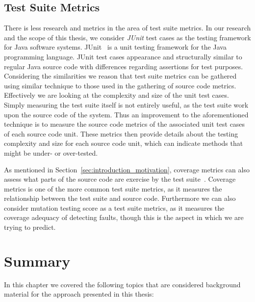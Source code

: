 \subsection{Test Suite Metrics}
\label{subsec:background_test_suite_metrics}
There is less research and metrics in the area of test suite metrics. In our research and the scope of this thesis, we consider \emph{JUnit} test cases as the testing framework for Java software systems. JUnit~\cite{JUnit} is a unit testing framework for the Java programming language. JUnit test cases appearance and structurally similar to regular Java source code with differences regarding assertions for test purposes. Considering the similarities we reason that test suite metrics can be gathered using similar technique to those used in the gathering of source code metrics. Effectively we are looking at the complexity and size of the unit test cases. Simply measuring the test suite itself is not entirely useful, as the test suite work upon the source code of the system. Thus an improvement to the aforementioned technique is to measure the source code metrics of the associated unit test cases of each source code unit. These metrics then provide details about the testing complexity and size for each source code unit, which can indicate methods that might be under- or over-tested.

As mentioned in Section~\ref{sec:introduction_motivation}, coverage metrics can also assess what parts of the source code are exercise by the test suite~\cite{ZHM97}. Coverage metrics is one of the more common test suite metrics, as it measures the relationship between the test suite and source code. Furthermore we can also consider mutation testing score as a test suite metrics, as it measures the coverage adequacy of detecting faults, though this is the aspect in which we are trying to predict.



\section{Summary}
\label{sec:background_summary}
In this chapter we covered the following topics that are considered background material for the approach presented in this thesis:

